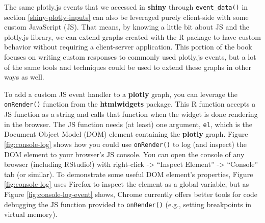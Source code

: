 \documentclass[
  12pt,
]{krantz}
\newenvironment{Shaded}{\begin{snugshade}}{\end{snugshade}}
\newcommand{\DataTypeTok}[1]{\textcolor[rgb]{0.13,0.29,0.53}{#1}}
\newcommand{\KeywordTok}[1]{\textcolor[rgb]{0.13,0.29,0.53}{\textbf{#1}}}
\newcommand{\NormalTok}[1]{#1}
\newcommand{\OperatorTok}[1]{\textcolor[rgb]{0.81,0.36,0.00}{\textbf{#1}}}
\newcommand{\StringTok}[1]{\textcolor[rgb]{0.31,0.60,0.02}{#1}}
\begin{document}
The same plotly.js events that we accessed in \textbf{shiny} through \texttt{event\_data()} in section \ref{shiny-plotly-inputs} can also be leveraged purely client-side with some custom JavaScript (JS). That means, by knowing a little bit about JS and the plotly.js library, we can extend graphs created with the R package to have custom behavior without requiring a client-server application. This portion of the book focuses on writing custom responses to commonly used plotly.js events, but a lot of the same tools and techniques could be used to extend these graphs in other ways as well.

To add a custom JS event handler to a \textbf{plotly} graph, you can leverage the \texttt{onRender()} function from the \textbf{htmlwidgets} package. This R function accepts a JS function as a string and calls that function when the widget is done rendering in the browser. The JS function needs (at least) one argument, \texttt{el}, which is the Document Object Model (DOM) element containing the \textbf{plotly} graph. Figure \ref{fig:console-log} shows how you could use \texttt{onRender()} to log (and inspect) the DOM element to your browser's JS console. You can open the console of any browser (including RStudio!) with right-click -\textgreater{} ``Inspect Element'' -\textgreater{} ``Console'' tab (or similar). To demonstrate some useful DOM element's properties, Figure \ref{fig:console-log} uses Firefox to inspect the element as a global variable, but as Figure \ref{fig:console-log-event} shows, Chrome currently offers better tools for code debugging the JS function provided to \texttt{onRender()} (e.g., setting breakpoints in virtual memory).

\begin{Shaded}
\end{Shaded}
\end{document}
